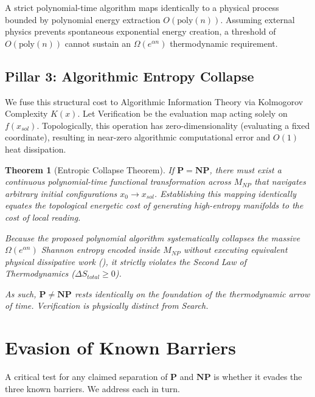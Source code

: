 \documentclass[12pt, a4paper]{article}
\newcommand{\Pc}{\mathbf{P}}
\newcommand{\NPc}{\mathbf{NP}}
\newcommand{\poly}{\text{poly}}
\theoremstyle{plain}
\newtheorem{theorem}{Theorem}[section]
\theoremstyle{definition}
\theoremstyle{remark}
\begin{document}
A strict polynomial-time algorithm maps identically to a physical process bounded by polynomial energy extraction $O(\poly(n))$. Assuming external physics prevents spontaneous exponential energy creation, a threshold of $O(\poly(n))$ cannot sustain an $\Omega(e^{\alpha n})$ thermodynamic requirement.

\subsection{Pillar 3: Algorithmic Entropy Collapse}\label{sec:entropy_collapse}

We fuse this structural cost to Algorithmic Information Theory via Kolmogorov Complexity $K(x)$. Let Verification be the evaluation map acting solely on $f(x_{sol})$. Topologically, this operation has zero-dimensionality (evaluating a fixed coordinate), resulting in near-zero algorithmic computational error and $O(1)$ heat dissipation.

\begin{theorem}[Entropic Collapse Theorem]\label{thm:main}
If $\Pc = \NPc$, there must exist a continuous polynomial-time functional transformation across $M_{NP}$ that navigates arbitrary initial configurations $x_0 \to x_{sol}$. Establishing this mapping identically equates the topological energetic cost of \emph{generating} high-entropy manifolds to the cost of local \emph{reading}. 

Because the proposed polynomial algorithm systematically collapses the massive $\Omega(e^{\alpha n})$ Shannon entropy encoded inside $M_{NP}$ without executing equivalent physical dissipative work (), it strictly violates the Second Law of Thermodynamics ($\Delta S_{total} \geq 0$). 

As such, $\Pc \neq \NPc$ rests identically on the foundation of the thermodynamic arrow of time. Verification is physically distinct from Search.
\end{theorem}

\section{Evasion of Known Barriers}\label{sec:barriers}

A critical test for any claimed separation of $\Pc$ and $\NPc$ is whether
it evades the three known barriers. We address each in turn.
\end{document}
